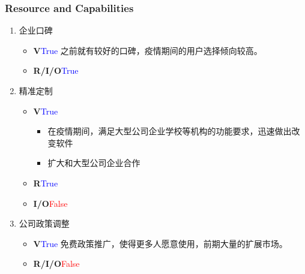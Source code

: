 \documentclass{beamer}
\begin{document}
\begin{frame}[allowframebreaks]
    \frametitle{Resource and Capabilities}
    \begin{enumerate}
        \item 企业口碑
        \begin{itemize}
            \item \textbf{V}\quad \textcolor{blue}{True} 
            之前就有较好的口碑，疫情期间的用户选择倾向较高。
            \item \textbf{R/I/O}\quad \textcolor{blue}{True}
        \end{itemize}
        \framebreak
        \item 精准定制
        \begin{itemize}
            \item \textbf{V}\quad \textcolor{blue}{True} 
            \begin{itemize}
                \item 在疫情期间，满足大型公司企业学校等机构的功能要求，迅速做出改变软件
                \item 扩大和大型公司企业合作
            \end{itemize}
            \item \textbf{R}\quad \textcolor{blue}{True} 
            \item \textbf{I/O}\quad \textcolor{red}{False} 
        \end{itemize}
        \item 公司政策调整 
        \begin{itemize}
            \item \textbf{V}\quad \textcolor{blue}{True} 免费政策推广，使得更多人愿意使用，前期大量的扩展市场。
            \item \textbf{R/I/O}\quad \textcolor{red}{False}
        \end{itemize}
        
    \end{enumerate}
    \framebreak
    
    


\end{frame}
\end{document}
